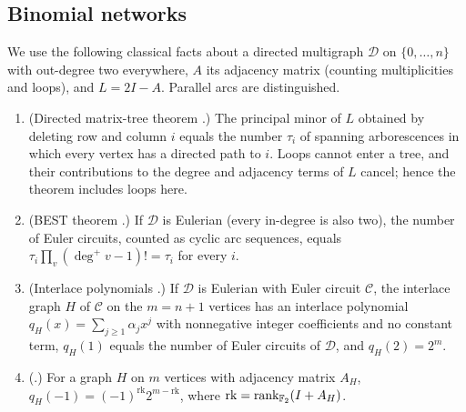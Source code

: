 \subsection{Binomial networks}
\label{app:algebraic-network}

We use the following classical facts about a directed multigraph
$\mathcal D$ on $\{0,\ldots,n\}$ with out-degree two everywhere, $A$ its
adjacency matrix (counting multiplicities and loops), and $L=2I-A$. Parallel
arcs are distinguished.
\begin{enumerate}[label=(N\arabic*)]
\item (Directed matrix-tree theorem \cite[Theorem~3.6]{Tutte1948}.) The principal minor
  of $L$ obtained by deleting row and column $i$ equals the number $\tau_i$ of
  spanning arborescences in which every vertex has a directed path to $i$.
  Loops cannot enter a tree, and their contributions to the degree and
  adjacency terms of $L$ cancel; hence the theorem includes loops here.
\item (BEST theorem \cite{vanAardenneEhrenfestDeBruijn1951}.) If $\mathcal D$
  is Eulerian (every in-degree is also two), the number of Euler circuits,
  counted as cyclic arc sequences, equals
  $\tau_i\prod_v(\deg^+v-1)!=\tau_i$ for every $i$.
\item (Interlace polynomials \cite{ArratiaBollobasSorkin2004}.) If $\mathcal D$
  is Eulerian with Euler circuit $\mathcal C$, the interlace graph $H$ of
  $\mathcal C$ on the $m=n+1$ vertices has an interlace polynomial
  $q_H(x)=\sum_{j\ge1}\alpha_jx^j$ with nonnegative integer coefficients and no
  constant term, $q_H(1)$ equals the number of Euler circuits of $\mathcal D$,
  and $q_H(2)=2^m$.
\item (\cite[Theorem~1]{BalisterBollobasCutlerPebody2002}.) For a graph $H$ on
  $m$ vertices with adjacency matrix $A_H$,
  $q_H(-1)=(-1)^{\mathrm{rk}}2^{m-\mathrm{rk}}$, where
  $\mathrm{rk}=\operatorname{rank}_{\mathbb F_2}(I+A_H)$.
\end{enumerate}

